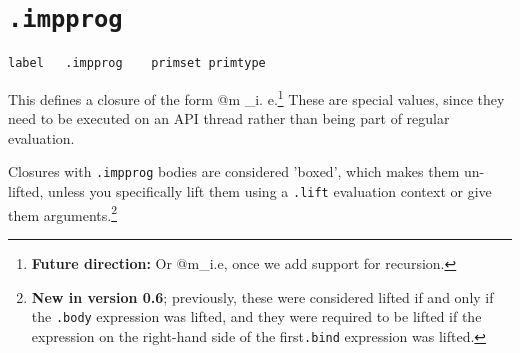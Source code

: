 \documentclass{report}
\newcommand\stringcode[1]{\texttt{#1}}
\newcommand\new[2]{\footnote{\textbf{New in version #1}; previously, #2}}
\newcommand\future[1]{\footnote{\textbf{Future direction:} #1}}
\begin{document}
\section{\stringcode{.impprog}}
\label{impprog}

\begin{verbatim}
label	.impprog	primset	primtype
\end{verbatim}

This defines a closure of the form \< @m _i. e\>.\future{Or \<\;\;@m\;\overline{g_i}_i.\;e\>, once we add support for recursion.}
These are special values, since they need to be executed on an API thread rather than being part of regular evaluation.

Closures with \stringcode{.impprog} bodies are considered 'boxed', which makes them un-lifted,
unless you specifically lift them using a \stringcode{.lift} evaluation context or give them arguments.\new{0.6}{
  these were considered lifted if and only if the \stringcode{.body} expression was lifted,
  and they were required to be lifted if the expression on the right-hand side of the first\stringcode{.bind} expression was lifted.
}
\end{document}
